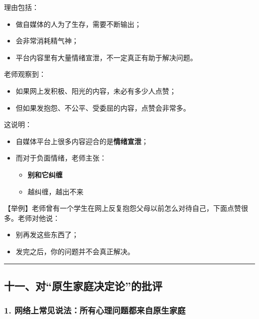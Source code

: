 \documentclass[
  chinese,
  9pt,
  a4paper,
]{ctexart}
\providecommand{\tightlist}{%
  \setlength{\itemsep}{0pt}\setlength{\parskip}{0pt}}
\begin{document}
理由包括：

\begin{itemize}
\tightlist
\item
  做自媒体的人为了生存，需要不断输出；
\item
  会非常消耗精气神；
\item
  平台内容里有大量情绪宣泄，不一定真正有助于解决问题。
\end{itemize}

老师观察到：

\begin{itemize}
\tightlist
\item
  如果网上发积极、阳光的内容，未必有多少人点赞；
\item
  但如果发抱怨、不公平、受委屈的内容，点赞会非常多。
\end{itemize}

这说明：

\begin{itemize}
\item
  自媒体平台上很多内容迎合的是\textbf{情绪宣泄}；
\item
  而对于负面情绪，老师主张：

  \begin{itemize}
  \tightlist
  \item
    \textbf{别和它纠缠}
  \item
    越纠缠，越出不来
  \end{itemize}
\end{itemize}

【举例】老师曾有一个学生在网上反复抱怨父母以前怎么对待自己，下面点赞很多。老师对他说：

\begin{itemize}
\tightlist
\item
  别再发这些东西了；
\item
  发完之后，你的问题并不会真正解决。
\end{itemize}

\begin{center}\rule{0.5\linewidth}{0.5pt}\end{center}

\subsection{十一、对``原生家庭决定论''的批评}\label{ux5341ux4e00ux5bf9ux539fux751fux5bb6ux5eadux51b3ux5b9aux8bbaux7684ux6279ux8bc4}

\subsubsection{1.
网络上常见说法：所有心理问题都来自原生家庭}\label{ux7f51ux7edcux4e0aux5e38ux89c1ux8bf4ux6cd5ux6240ux6709ux5fc3ux7406ux95eeux9898ux90fdux6765ux81eaux539fux751fux5bb6ux5ead}
\end{document}
